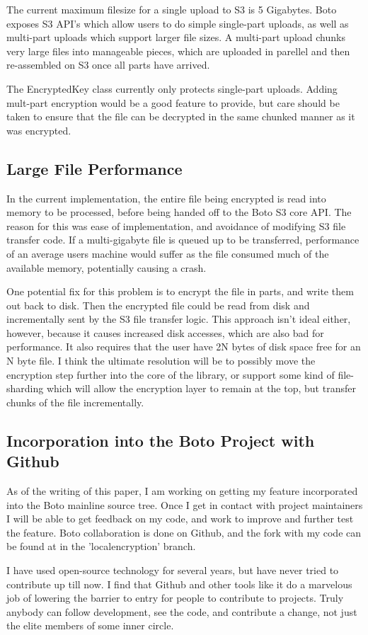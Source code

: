 The current maximum filesize for a single upload to S3 is 5 Gigabytes. Boto exposes S3 API's which allow users to do simple
single-part uploads, as well as multi-part uploads which support larger file sizes. A multi-part upload chunks very large 
files into manageable pieces, which are uploaded in parellel and then re-assembled on S3 once all parts have arrived.

The EncryptedKey class currently only protects single-part uploads. Adding mult-part encryption would be a good feature
to provide, but care should be taken to ensure that the file can be decrypted in the same chunked manner as it was
encrypted.

\subsection{Large File Performance}

In the current implementation, the entire file being encrypted is read into memory to be processed, before being handed off
to the Boto S3 core API. The reason for this was ease of implementation, and avoidance of modifying S3 file transfer code.
If a multi-gigabyte file is queued up to be transferred, performance of an average users machine would suffer as the file 
consumed much of the available memory, potentially causing a crash.

One potential fix for this problem is to encrypt the file in parts, and write them out back to disk. Then the encrypted file could be read from disk and incrementally sent by the S3 file transfer logic. This approach isn't ideal either, however, because it causes
increased disk accesses, which are also bad for performance. It also requires that the user have 2N bytes of disk 
space free for an N byte file. I think the ultimate resolution will be to possibly move the encryption step further into the core
of the library, or support some kind of file-sharding which will allow the encryption layer to remain at the top, but transfer chunks of the file incrementally.

\subsection{Incorporation into the Boto Project with Github}
As of the writing of this paper, I am working on getting my feature incorporated into the Boto mainline source tree. Once I 
get in contact with project maintainers I will be able to get feedback on my code, and work to improve and further test the
feature. Boto collaboration is done on Github, and the fork with my code can be found at \cite{CodyBoto} in the 'localencryption' branch.

I have used open-source technology for several years, but have never tried to contribute up till now. I find that Github and other tools like it do a marvelous job of
lowering the barrier to entry for people to contribute to projects. Truly anybody can follow development, see the code, and contribute a change, not just the elite members of some inner circle.



